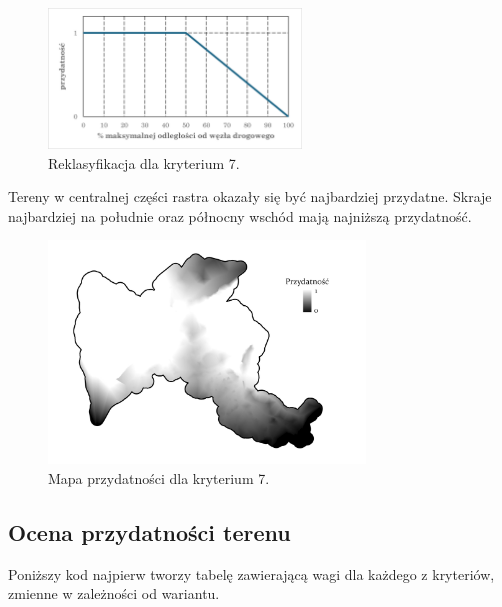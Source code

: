 \documentclass{article}
\begin{document}
\vspace{5pt}

\begin{figure}[H]
    \centering
    \includegraphics[width=0.6\textwidth]{img/kryterium7-wykres-glowny.png}
    \caption{Reklasyfikacja dla kryterium 7.}
\end{figure}
\vspace{10pt}

Tereny w centralnej części rastra okazały się być najbardziej przydatne. Skraje najbardziej na południe oraz północny wschód mają najniższą przydatność.
\vspace{5pt}

\begin{figure}[H]
    \centering
    \includegraphics[width=0.75\textwidth]{img/kryterium7-layout.jpg}
    \caption{Mapa przydatności dla kryterium 7.}
\end{figure}
\vspace{10pt}

\newpage
\subsection{Ocena przydatności terenu}
Poniższy kod najpierw tworzy tabelę zawierającą wagi dla każdego z kryteriów, zmienne w zależności od wariantu. 
\vspace{5pt}
\end{document}
